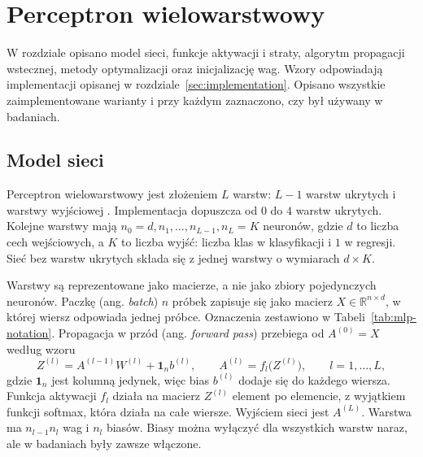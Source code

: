 \section{Perceptron wielowarstwowy}
\label{sec:mlp}

W rozdziale opisano model sieci, funkcje aktywacji i straty, algorytm propagacji wstecznej, metody optymalizacji oraz inicjalizację wag. Wzory odpowiadają implementacji opisanej w rozdziale~\ref{sec:implementation}. Opisano wszystkie zaimplementowane warianty i przy każdym zaznaczono, czy był używany w badaniach.

\subsection{Model sieci}
\label{sec:mlp-model}

Perceptron wielowarstwowy jest złożeniem $L$ warstw: $L-1$ warstw ukrytych i warstwy wyjściowej \cite{goodfellow2016}. Implementacja dopuszcza od $0$ do $4$ warstw ukrytych. Kolejne warstwy mają $n_0 = d, n_1, \dots, n_{L-1}, n_L = K$ neuronów, gdzie $d$ to liczba cech wejściowych, a $K$ to liczba wyjść: liczba klas w klasyfikacji i $1$ w regresji. Sieć bez warstw ukrytych składa się z jednej warstwy o wymiarach $d \times K$.

Warstwy są reprezentowane jako macierze, a nie jako zbiory pojedynczych neuronów. Paczkę (ang. \textit{batch}) $n$ próbek zapisuje się jako macierz $X \in \mathbb{R}^{n \times d}$, w której wiersz odpowiada jednej próbce. Oznaczenia zestawiono w Tabeli~\ref{tab:mlp-notation}. Propagacja w przód (ang. \textit{forward pass}) przebiega od $A^{(0)} = X$ według wzoru
\begin{equation}
    Z^{(l)} = A^{(l-1)} W^{(l)} + \mathbf{1}_n b^{(l)}, \qquad A^{(l)} = f_l\big(Z^{(l)}\big), \qquad l = 1, \dots, L,
    \label{eq:forward}
\end{equation}
gdzie $\mathbf{1}_n$ jest kolumną jedynek, więc bias $b^{(l)}$ dodaje się do każdego wiersza. Funkcja aktywacji $f_l$ działa na macierz $Z^{(l)}$ element po elemencie, z wyjątkiem funkcji softmax, która działa na całe wiersze. Wyjściem sieci jest $A^{(L)}$. Warstwa ma $n_{l-1} n_l$ wag i $n_l$ biasów. Biasy można wyłączyć dla wszystkich warstw naraz, ale w badaniach były zawsze włączone.

